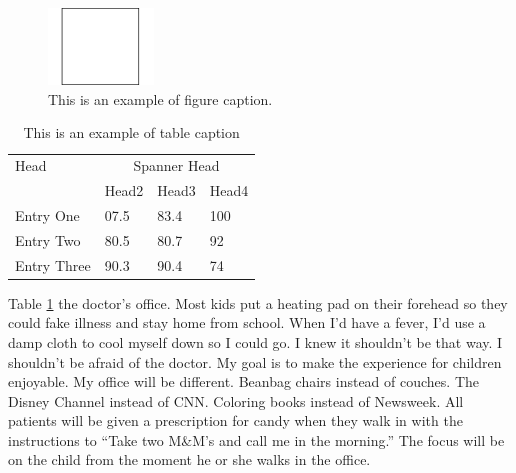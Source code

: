 \documentclass[final]{clv2025}
\begin{document}
\begin{figure}[t!]
\begin{center}
\includegraphics[width=0.25\textwidth]{ex.pdf}
\end{center}
\caption{This is an example of figure caption.}
\label{fig:ex}
\end{figure}

\begin{table}[b!]
\caption{This is an example of table caption}
\label{tab:ex}
\begin{tabular}{llll}
\toprule
Head&\multicolumn{3}{c}{Spanner Head}\\
\cmidrule{2-4}
&Head2&Head3&Head4\\
\midrule
Entry One&07.5&83.4&100\\
Entry Two&80.5&80.7&92\\
Entry Three&90.3&90.4&74\\
\bottomrule
\end{tabular}
\end{table}

Table \ref{tab:ex} the doctor's office. Most kids put a heating pad on their forehead so they could fake illness and stay home from school. When I'd have a fever, I'd use a damp cloth to cool myself down so I could go. I knew it shouldn't be that way. I shouldn't be afraid of the doctor. My goal is to make the experience for children enjoyable. My office will be different. Beanbag chairs instead of couches. The Disney Channel instead of CNN. Coloring books instead of Newsweek. All patients will be given a prescription for candy when they walk in with the instructions to ``Take two M\&M's and call me in the morning.'' The focus will be on the child from the moment he or she walks in the office.

\appendix

\end{document}
